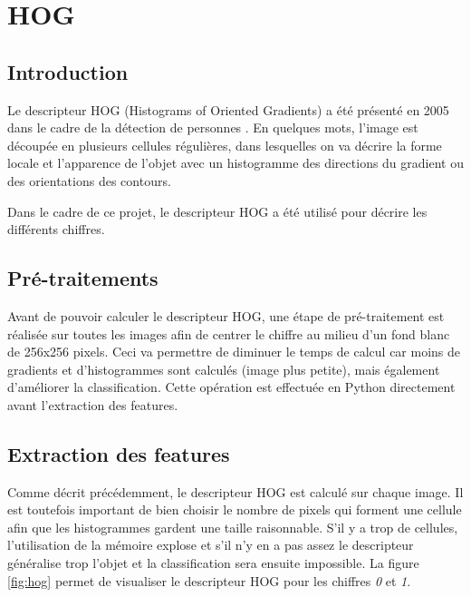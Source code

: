 
\chapter{HOG}

\section{Introduction}

Le descripteur HOG (Histograms of Oriented Gradients) a été présenté en 2005 dans le cadre de la détection de personnes \cite{NavneetHOG}. En quelques mots, l'image est découpée en plusieurs cellules régulières, dans lesquelles on va décrire la forme locale et l'apparence de l'objet avec un histogramme des directions du gradient ou des orientations des contours.

Dans le cadre de ce projet, le descripteur HOG a été utilisé pour décrire les différents chiffres.

\section{Pré-traitements}
Avant de pouvoir calculer le descripteur HOG, une étape de pré-traitement est réalisée sur toutes les images afin de centrer le chiffre au milieu d'un fond blanc de 256x256 pixels. Ceci va permettre de diminuer le temps de calcul car moins de gradients et d'histogrammes sont calculés (image plus petite), mais également d'améliorer la classification. Cette opération est effectuée en Python directement avant l'extraction des features.

\section{Extraction des features}

Comme décrit précédemment, le descripteur HOG est calculé sur chaque image. Il est toutefois important de bien choisir le nombre de pixels qui forment une cellule afin que les histogrammes gardent une taille raisonnable. S'il y a trop de cellules, l'utilisation de la mémoire explose et s'il n'y en a pas assez le descripteur généralise trop l'objet et la classification sera ensuite impossible. La figure \vref{fig:hog} permet de visualiser le descripteur HOG pour les chiffres \emph{0} et \emph{1}.

